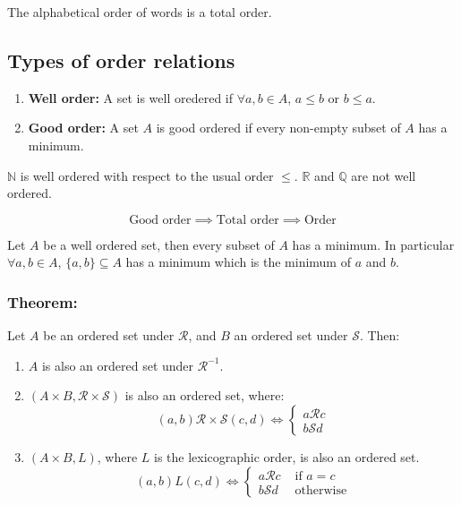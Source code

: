\documentclass[11pt]{article}
\begin{document}
The alphabetical order of words is a total order.

\subsection{Types of order relations}
\begin{enumerate}
    \item \textbf{Well order:} A set is well oredered if $\forall a, b \in A$, $a \leq b$ or $b \leq a$.
    \item \textbf{Good order:} A set $A$ is good ordered if every non-empty subset of $A$ has a minimum.
\end{enumerate}

$\mathbb{N}$ is well ordered with respect to the usual order $\leq$.
$\mathbb{R}$ and $\mathbb{Q}$ are not well ordered.

\[
\text{Good order} \implies \text{Total order} \implies \text{Order}
\]

Let $A$ be a well ordered set, then every subset of $A$ has a minimum. In particular $\forall a, b \in A$, $\{a,b\} \subseteq A$ has a minimum which is the minimum of $a$ and $b$.

\subsubsection{Theorem:}
Let $A$ be an ordered set under $\mathcal{R}$, and $B$ an ordered set under $\mathcal{S}$. Then:
\begin{enumerate}
    \item $A$ is also an ordered set under $\mathcal{R}^{-1}$.
    \item $(A \times B, \mathcal{R} \times \mathcal{S})$ is also an ordered set, where:
    \[
    (a,b) \mathcal{R} \times \mathcal{S} (c,d) \Longleftrightarrow \begin{cases}
        a \mathcal{R} c \\
        b \mathcal{S} d
    \end{cases}
    \]
    \item $(A \times B, L)$, where $L$ is the lexicographic order, is also an ordered set.
    \[
    (a,b) L (c,d) \Longleftrightarrow \begin{cases}
        a \mathcal{R} c & \text{ if } a = c\\
        b \mathcal{S} d & \text{ otherwise}
    \end{cases}
    \]
\end{enumerate}
\end{document}
